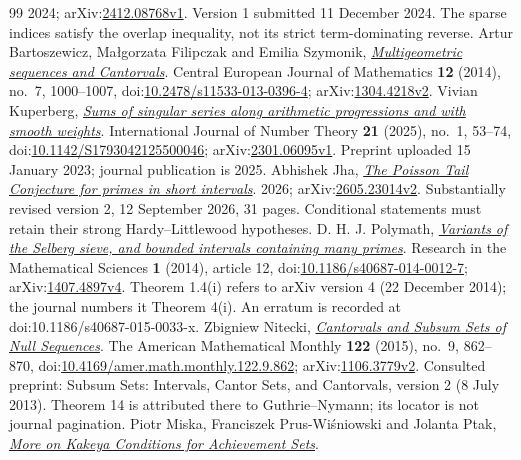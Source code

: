\begin{thebibliography}{99}
  2024; arXiv:\href{https://arxiv.org/abs/2412.08768v1}{2412.08768v1}. Version 1 submitted 11 December 2024. The sparse indices satisfy the overlap inequality, not its strict term-dominating reverse.
 Artur Bartoszewicz, Ma{\l}gorzata Filipczak and Emilia Szymonik, \href{https://arxiv.org/abs/1304.4218v2}{\emph{Multigeometric sequences and Cantorvals}}.
  Central European Journal of Mathematics \textbf{12} (2014), no.~7, 1000--1007, doi:\href{https://doi.org/10.2478/s11533-013-0396-4}{10.2478/s11533-013-0396-4}; arXiv:\href{https://arxiv.org/abs/1304.4218v2}{1304.4218v2}.
 Vivian Kuperberg, \href{https://arxiv.org/abs/2301.06095v1}{\emph{Sums of singular series along arithmetic progressions and with smooth weights}}.
  International Journal of Number Theory \textbf{21} (2025), no.~1, 53--74, doi:\href{https://doi.org/10.1142/S1793042125500046}{10.1142/S1793042125500046}; arXiv:\href{https://arxiv.org/abs/2301.06095v1}{2301.06095v1}. Preprint uploaded 15 January 2023; journal publication is 2025.
 Abhishek Jha, \href{https://arxiv.org/abs/2605.23014v2}{\emph{The Poisson Tail Conjecture for primes in short intervals}}.
  2026; arXiv:\href{https://arxiv.org/abs/2605.23014v2}{2605.23014v2}. Substantially revised version 2, 12 September 2026, 31 pages. Conditional statements must retain their strong Hardy--Littlewood hypotheses.
 {D. H. J. Polymath}, \href{https://arxiv.org/abs/1407.4897v4}{\emph{Variants of the Selberg sieve, and bounded intervals containing many primes}}.
  Research in the Mathematical Sciences \textbf{1} (2014), article 12, doi:\href{https://doi.org/10.1186/s40687-014-0012-7}{10.1186/s40687-014-0012-7}; arXiv:\href{https://arxiv.org/abs/1407.4897v4}{1407.4897v4}. Theorem 1.4(i) refers to arXiv version 4 (22 December 2014); the journal numbers it Theorem 4(i). An erratum is recorded at doi:10.1186/s40687-015-0033-x.
 Zbigniew Nitecki, \href{https://arxiv.org/abs/1106.3779v2}{\emph{Cantorvals and Subsum Sets of Null Sequences}}.
  The American Mathematical Monthly \textbf{122} (2015), no.~9, 862--870, doi:\href{https://doi.org/10.4169/amer.math.monthly.122.9.862}{10.4169/amer.math.monthly.122.9.862}; arXiv:\href{https://arxiv.org/abs/1106.3779v2}{1106.3779v2}. Consulted preprint: Subsum Sets: Intervals, Cantor Sets, and Cantorvals, version 2 (8 July 2013). Theorem 14 is attributed there to Guthrie--Nymann; its locator is not journal pagination.
 Piotr Miska, Franciszek Prus-Wi\'sniowski and Jolanta Ptak, \href{https://ruj.uj.edu.pl/server/api/core/bitstreams/d6630f7b-e6ee-4de8-8a1b-81c7b4c59d2e/content}{\emph{More on Kakeya Conditions for Achievement Sets}}.

\end{thebibliography}
